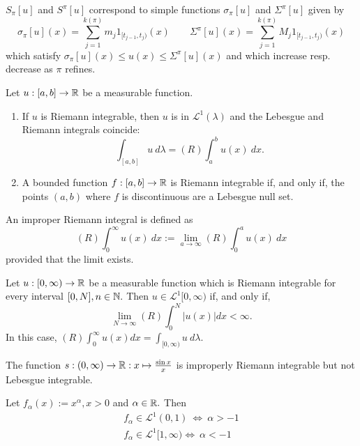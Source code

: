 \begin{prop}
\(S_{\pi }[u]\) and \(S^\pi [u]\) correspond to simple functions \(\sigma _\pi [u]\) and \(\Sigma ^\pi [u]\) given by
\[
\sigma _\pi [u](x) = \sum _{j=1}^{k(\pi )} m_{j} 1_{[t_{j-1},t_{j})}(x) \qquad \Sigma ^\pi [u](x)= \sum _{j=1}^{k(\pi )}M_{j} 1_{[t_{j-1},t_{j})}(x)
\]
which satisfy \(\sigma _\pi [u](x)\leq u(x)\leq \Sigma ^\pi [u](x)\) and which increase resp. decrease as \(\pi \) refines.
\end{prop}

\begin{thm}
Let \(u:[a,b]\rightarrow \Bbb{R}\) be a measurable function.

\begin{enumerate}
  \item If \(u\) is Riemann integrable, then \(u\) is in \(\mathcal{L}^1(\lambda )\) and the Lebesgue and Riemann integrals coincide:
\[
\int _{[a,b]}u\  d\lambda  = (R) \int _{a}^b u(x)\  dx.
\]
  \item A bounded function $f:[a,b]\rightarrow \Bbb{R}$ is Riemann integrable if, and only if, the points \((a,b)\) where \(f\) is discontinuous are a Lebesgue null set.
\end{enumerate}
\end{thm}


\begin{defn}
An improper Riemann integral is defined as
\[
(R)\int _{0}^\infty  u(x)\  dx := \lim_{a\rightarrow \infty }(R) \int _{0}^a u(x)\  dx
\]
provided that the limit exists.
\end{defn}

\begin{thm}
Let \(u:[0,\infty ) \rightarrow \Bbb{R}\) be a measurable function which is Riemann integrable for every interval \([0,N], n\in \Bbb{N}.\) Then \(u\in \mathcal{L}^1[0,\infty )\) if, and only if,
\[
\lim_{N\rightarrow \infty }(R)\int _{0}^N |u(x)| dx <\infty .
\]
In this case, \((R)\int _{0}^\infty  u(x) dx = \int _{[0,\infty )}u\  d\lambda .\)
\end{thm}

\begin{prop}
The function \(s : (0,\infty ) \rightarrow  \Bbb{R} : x\mapsto  \frac{\sin x}{x}\) is improperly Riemann integrable but not Lebesgue integrable.
\end{prop}

\begin{prop}
Let \(f_\alpha (x):= x^\alpha , x>0\) and \(\alpha \in \Bbb{R}.\) Then
\begin{gather*}
f_\alpha \in \mathcal{L}^1(0,1)\  \Longleftrightarrow \  \alpha >-1 \\
f_\alpha  \in \mathcal{L}^1[1,\infty ) \Longleftrightarrow \  \alpha <-1
\end{gather*}
\end{prop}

